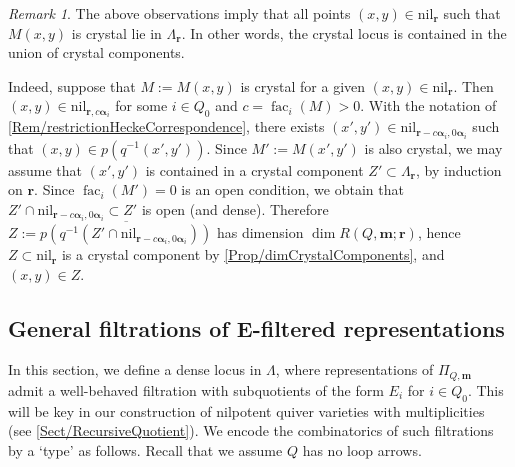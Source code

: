 \documentclass[a4paper,12pt]{article}
\theoremstyle{definition}
\theoremstyle{plain}
\theoremstyle{remark}
\newtheorem{remark}[definition]{Remark}
\DeclareMathOperator{\fac}{fac}
\newcommand\bfalpha{\bm{\alpha}}
\newcommand\bfm{\mathbf{m}}
\newcommand\bfr{\mathbf{r}}
\begin{document}
\begin{remark}\label{Rmk/crystalLocusVScrystalComponents}
The above observations imply that all points $(x,y)\in\mathrm{nil}_\bfr$ such that $M(x,y)$ is crystal lie in $\Lambda_\bfr$. In other words, the crystal locus is contained in the union of crystal components.

Indeed, suppose that $M:=M(x,y)$ is crystal for a given $(x,y)\in\mathrm{nil}_\bfr$. Then $(x,y)\in\mathrm{nil}_{\bfr,c\bfalpha_i}$ for some $i\in Q_0$ and $c=\fac_i(M)>0$. With the notation of \cref{Rem/restrictionHeckeCorrespondence}, there exists $(x',y')\in\mathrm{nil}_{\bfr-c\bfalpha_i,0\bfalpha_i}$ such that $(x,y)\in p(q^{-1}(x',y'))$. Since $M':=M(x',y')$ is also crystal, we may assume that $(x',y')$ is contained in a crystal component $Z'\subset\Lambda_{\bfr}$, by induction on $\bfr$. Since $\fac_{i}(M')=0$ is an open condition, we obtain that $Z'\cap\mathrm{nil}_{\bfr-c\bfalpha_i,0\bfalpha_i}\subset Z'$ is open (and dense). Therefore $Z:=\overline{p(q^{-1}(Z'\cap\mathrm{nil}_{\bfr-c\bfalpha_i,0\bfalpha_i}))}$ has dimension $\dim R(Q,\bfm;\bfr)$, hence $Z\subset\mathrm{nil}_\bfr$ is a crystal component by \cref{Prop/dimCrystalComponents}, and $(x,y)\in Z$.
\end{remark}


\subsection{General filtrations of E-filtered representations}

In this section, we define a dense locus in $\Lambda$, where representations of $\Pi_{Q,\bfm}$ admit a well-behaved filtration with subquotients of the form $E_i$ for $ i\in Q_0$. This will be key in our construction of nilpotent quiver varieties with multiplicities (see \cref{Sect/RecursiveQuotient}). We encode the combinatorics of such filtrations by a \lq type' as follows. Recall that we assume $Q$ has no loop arrows.

\end{document}
